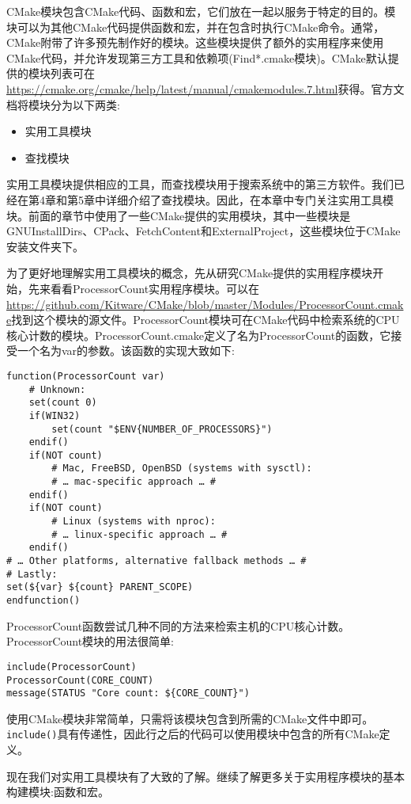 CMake模块包含CMake代码、函数和宏，它们放在一起以服务于特定的目的。模块可以为其他CMake代码提供函数和宏，并在包含时执行CMake命令。通常，CMake附带了许多预先制作好的模块。这些模块提供了额外的实用程序来使用CMake代码，并允许发现第三方工具和依赖项(Find*.cmake模块)。CMake默认提供的模块列表可在\url{https://cmake.org/cmake/help/latest/manual/cmakemodules.7.html}获得。官方文档将模块分为以下两类:

\begin{itemize}
\item 
实用工具模块

\item 
查找模块
\end{itemize}

实用工具模块提供相应的工具，而查找模块用于搜索系统中的第三方软件。我们已经在第4章和第5章中详细介绍了查找模块。因此，在本章中专门关注实用工具模块。前面的章节中使用了一些CMake提供的实用模块，其中一些模块是GNUInstallDirs、CPack、FetchContent和ExternalProject，这些模块位于CMake安装文件夹下。

为了更好地理解实用工具模块的概念，先从研究CMake提供的实用程序模块开始，先来看看ProcessorCount实用程序模块。可以在\url{https://github.com/Kitware/CMake/blob/master/Modules/ProcessorCount.cmake}找到这个模块的源文件。ProcessorCount模块可在CMake代码中检索系统的CPU核心计数的模块。ProcessorCount.cmake定义了名为ProcessorCount的函数，它接受一个名为var的参数。该函数的实现大致如下:

\begin{lstlisting}[style=styleCMake]
function(ProcessorCount var)
	# Unknown:
	set(count 0)
	if(WIN32)
		set(count "$ENV{NUMBER_OF_PROCESSORS}")
	endif()
	if(NOT count)
		# Mac, FreeBSD, OpenBSD (systems with sysctl):
		# … mac-specific approach … #
	endif()
	if(NOT count)
		# Linux (systems with nproc):
		# … linux-specific approach … #
	endif()
# … Other platforms, alternative fallback methods … #
# Lastly:
set(${var} ${count} PARENT_SCOPE)
endfunction()
\end{lstlisting}

ProcessorCount函数尝试几种不同的方法来检索主机的CPU核心计数。ProcessorCount模块的用法很简单:

\begin{lstlisting}[style=styleCMake]
include(ProcessorCount)
ProcessorCount(CORE_COUNT)
message(STATUS "Core count: ${CORE_COUNT}")
\end{lstlisting}

使用CMake模块非常简单，只需将该模块包含到所需的CMake文件中即可。\texttt{include()}具有传递性，因此行之后的代码可以使用模块中包含的所有CMake定义。

现在我们对实用工具模块有了大致的了解。继续了解更多关于实用程序模块的基本构建模块:函数和宏。



























